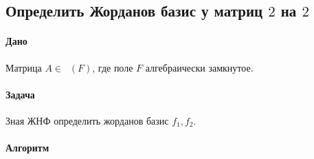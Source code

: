 \documentclass{article}
\newcommand{\Matrix}[2]{\mathop{\mathrm{M}_{#2}}(#1)}
\begin{document}
\subsection{Определить Жорданов базис у матриц $2$ на $2$}

\paragraph{Дано} Матрица $A \in \Matrix{F}{2}$, где поле $F$ алгебраически замкнутое.

\paragraph{Задача} Зная ЖНФ определить жорданов базис $f_1, f_2$.

\paragraph{Алгоритм}
\end{document}
